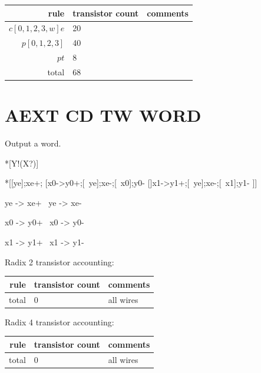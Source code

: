 \documentclass{article}
\begin{document}
\begin{center}
    \begin{tabular}{|r|l|l|}
    \hline
    rule & transistor count & comments \\ \hline
    $c[0,1,2,3,w]e$ & 20 & \\ \hline
    $p[0,1,2,3]$ & 40 & \\ \hline
    $pt$ & 8 & \\ \hline
    \hline total & 68 & \\ \hline
    \end{tabular}
\end{center}

\section{AEXT CD TW WORD \label{sec:AEXT_CD_TW_WORD}}

Output a word.

\begin{csp}
*[Y!(X?)]
\end{csp}

\begin{hse}
*[[ye];xe+;
  [x0->y0+;[~ye];xe-;[~x0];y0-
  []x1->y1+;[~ye];xe-;[~x1];y1-
 ]]
\end{hse}

\begin{prs2}
ye -> xe+
~ye -> xe-
\end{prs2}

\begin{prs2}
x0 -> y0+
~x0 -> y0-

x1 -> y1+
~x1 -> y1-
\end{prs2}

\noindent
Radix 2 transistor accounting:

\begin{center}
    \begin{tabular}{|r|l|l|}
    \hline
    rule & transistor count & comments \\ \hline
    \hline total & 0 & all wires\\ \hline
    \end{tabular}
\end{center}

\noindent
Radix 4 transistor accounting:

\begin{center}
    \begin{tabular}{|r|l|l|}
    \hline
    rule & transistor count & comments \\ \hline
    \hline total & 0 & all wires \\ \hline
    \end{tabular}
\end{center}
\end{document}
